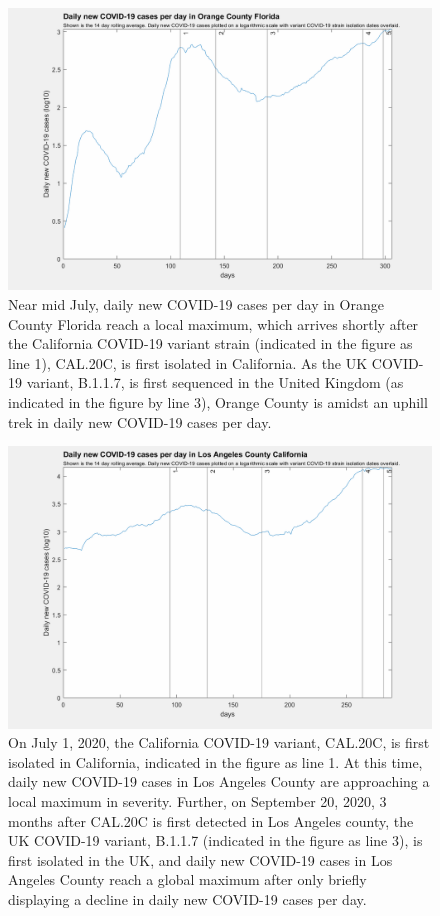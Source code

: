 \documentclass[]{article}
\begin{document}
\begin{figure}[!h]
	\includegraphics[width=\linewidth]{images/orange_cases_strains_log.png}
	\caption{Near mid July, daily new COVID-19 cases per day in Orange County Florida reach a local maximum, which arrives shortly after the California COVID-19 variant strain (indicated in the figure as line 1), CAL.20C, is first isolated in California. As the UK COVID-19 variant, B.1.1.7, is first sequenced in the United Kingdom (as indicated in the figure by line 3), Orange County is amidst an uphill trek in daily new COVID-19 cases per day.   }
	\label{fig:images/orange_cases_strains_logLabel}
\end{figure}

\begin{figure}[!h]
	\includegraphics[width=\linewidth]{images/los_angeles_cases_strains_log.png}
	\caption{On July 1, 2020, the California COVID-19 variant, CAL.20C, is first isolated in California, indicated in the figure as line 1. At this time, daily new COVID-19 cases in Los Angeles County are approaching a local maximum in severity. Further, on September 20, 2020, 3 months after CAL.20C is first detected in Los Angeles county, the UK COVID-19 variant, B.1.1.7 (indicated in the figure as line 3), is first isolated in the UK, and daily new COVID-19 cases in Los Angeles County reach a global maximum after only briefly displaying a decline in daily new COVID-19 cases per day.  }
	\label{fig:images/los_angeles_cases_strains_logLabel}
\end{figure}
\end{document}

